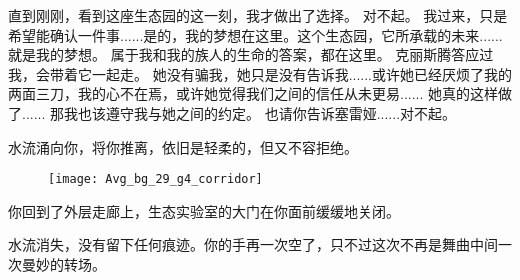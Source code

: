 \documentclass[openany]{book}
\begin{document}
\begin{dialogue}
     直到刚刚，看到这座生态园的这一刻，我才做出了选择。
     对不起。
     我过来，只是希望能确认一件事......是的，我的梦想在这里。这个生态园，它所承载的未来......就是我的梦想。
     属于我和我的族人的生命的答案，都在这里。
     克丽斯腾答应过我，会带着它一起走。
     她没有骗我，她只是没有告诉我......或许她已经厌烦了我的两面三刀，我的心不在焉，或许她觉得我们之间的信任从未更易......
     她真的这样做了......
     那我也该遵守我与她之间的约定。
     也请你告诉塞雷娅......对不起。
\end{dialogue}\par

水流涌向你，将你推离，依旧是轻柔的，但又不容拒绝。\par
\begin{figure}[h]
    \centering
    \texttt{[image: Avg\_bg\_29\_g4\_corridor]}
\end{figure}
你回到了外层走廊上，生态实验室的大门在你面前缓缓地关闭。\par
水流消失，没有留下任何痕迹。你的手再一次空了，只不过这次不再是舞曲中间一次曼妙的转场。
\end{document}
